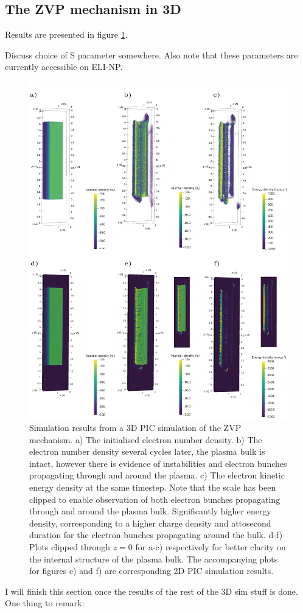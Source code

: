 \subsection{The ZVP mechanism in 3D}
Results are presented in figure \ref{fig:zvp3d}.

Discuss choice of S parameter somewhere. Also note that these parameters are currently accessible on ELI-NP.

\begin{figure}
	\centering
	\includegraphics[width=1\linewidth]{figures/zvp/zvp_3D}
	\caption{Simulation results from a 3D \ac{PIC} simulation of the \ac{ZVP} mechanism. a) The initialised electron number density. b) The electron number density several cycles later, the plasma bulk is intact, however there is evidence of instabilities and electron bunches propagating through and around the plasma. c) The electron kinetic energy density at the same timestep. Note that the scale has been clipped to enable observation of both electron bunches propagating through and around the plasma bulk. Significantly higher energy density, corresponding to a higher charge density and attosecond duration for the electron bunches propagating around the bulk. d-f) Plots clipped through $z=0$ for a-c) respectively for better clarity on the internal structure of the plasma bulk. The accompanying plots for figures e) and f) are corresponding 2D PIC simulation results.}
	\label{fig:zvp3d}
\end{figure}
I will finish this section once the results of the rest of the 3D sim stuff is done. One thing to remark:

